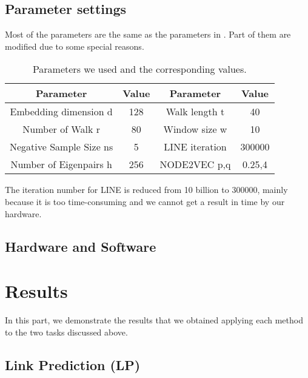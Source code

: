 \documentclass[a4paper]{article}
\begin{document}
\subsection{Parameter settings}
\noindent Most of the parameters are the same as the parameters in \cite{1}. Part of them are modified due to some special reasons.
\begin{table}[H]
    \centering
\begin{tabular}{c|c|c|c}
\toprule  
Parameter& Value& Parameter &Value\\
\midrule  
Embedding dimension d & 128& Walk length t&40\\
Number of Walk r& 80& Window size w& 10\\
Negative Sample Size ns & 5& LINE iteration& 300000\\
Number of Eigenpairs h & 256& NODE2VEC p,q& 0.25,4\\
\bottomrule 
\end{tabular}
\caption{Parameters we used and the corresponding values.}
\end{table}
\noindent The iteration number for LINE is reduced from 10 billion to 300000, mainly because it is too time-consuming and we cannot get a result in time by our hardware.



\subsection{Hardware and Software}

\section{Results}

\noindent In this part, we demonstrate the results that we obtained applying each method to the two tasks discussed above. 


%

\subsection{Link Prediction (LP)}
\end{document}
